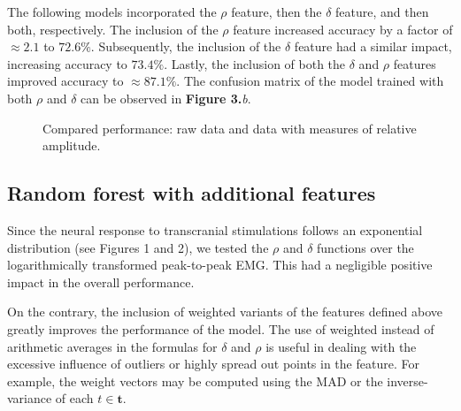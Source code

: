 \documentclass{article}
\begin{document}
\begin{multicols}{2}
The following models incorporated the $\rho$ feature, then the $\delta$ feature,
and then both, respectively. The inclusion of the $\rho$ feature increased
accuracy by a factor of $\approx 2.1$ to $72.6\%$. Subsequently, the inclusion
of the $\delta$ feature had a similar impact, increasing accuracy to $73.4\%$.
Lastly, the inclusion of both the $\delta$ and $\rho$ features improved accuracy
to $\approx 87.1\%$. The confusion matrix of the model trained with both $\rho$
and $\delta$ can be observed in \textbf{Figure 3.}\textit{b}.

\begin{figure}[H]
  \centering
  \hfill
  \caption{Compared performance: raw data and data with measures of relative
  amplitude.}
  \label{fig:two_images}
\end{figure}


\subsection{Random forest with additional features}

Since the neural response to transcranial stimulations follows an exponential
distribution (see Figures 1 and 2), we tested the $\rho$ and $\delta$ functions
over the logarithmically transformed peak-to-peak EMG. This had a negligible
positive impact in the overall performance.

On the contrary, the inclusion of weighted variants of the features defined
above greatly improves the performance of the model. The use of weighted instead
of arithmetic averages in the formulas for $\delta$ and $\rho$ is useful in
dealing with the excessive influence of outliers or highly spread out points in
the feature. For example, the weight vectors may be computed using the MAD or
the inverse-variance of each $t \in \textbf{t}$. 


\end{multicols}
\end{document}
